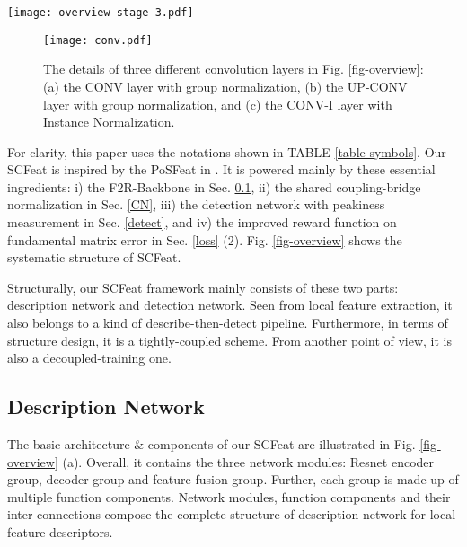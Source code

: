 \documentclass[journal]{IEEEtran}
\begin{document}
\begin{figure*}[ht]
\centering
\texttt{[image: overview-stage-3.pdf]} \caption{Systematical structure of proposed SCFeat: (a) description network, (b) shared coupling-bridge normalization, and (c) detection network.}
\label{fig-overview}
\end{figure*}

\begin{figure}[t]
\centering
\texttt{[image: conv.pdf]} \caption{The details of three different convolution layers in Fig. \ref{fig-overview}: (a) the CONV layer with group normalization, (b) the UP-CONV layer with group normalization, and (c) the CONV-I layer with Instance Normalization.}
\label{fig3conv}
\end{figure}



For clarity, this paper uses the notations shown in TABLE \ref{table-symbols}. Our SCFeat is inspired by the PoSFeat in \cite{li2022decoupling}. It is powered mainly by these essential ingredients: i) the F2R-Backbone in Sec. \ref{description}, ii) the shared coupling-bridge normalization in Sec. \ref{CN}, iii) the detection network with peakiness measurement in Sec. \ref{detect}, and iv) the improved reward function on fundamental matrix error in Sec. \ref{loss} (2). Fig. \ref{fig-overview} shows the systematic structure of SCFeat.



Structurally, our SCFeat framework mainly consists of these two parts: description network and detection network. Seen from local feature extraction, it also belongs to a kind of describe-then-detect pipeline. Furthermore, in terms of structure design, it is a tightly-coupled scheme. From another point of view, it is also a decoupled-training one.













\subsection{Description Network} \label{description}




The basic architecture \& components of our SCFeat are illustrated in Fig. \ref{fig-overview} (a). Overall, it contains the three network modules: Resnet encoder group, decoder group and feature fusion group. Further, each group is made up of multiple function components.
Network modules, function components and their inter-connections compose the complete structure of description network for local feature descriptors.
\end{document}
